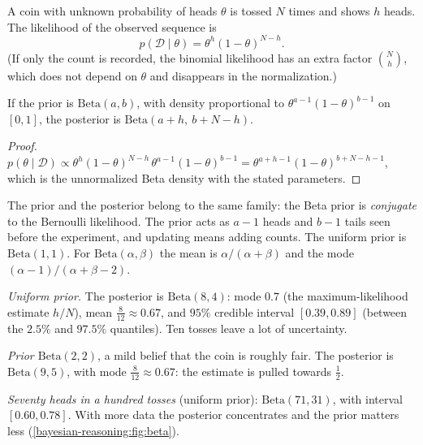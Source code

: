 \begin{notechapter}
A coin with unknown probability of heads $\theta$ is tossed $N$ times and shows
$h$ heads. The likelihood of the observed sequence is
\[
  p(\mathcal D\mid\theta) = \theta^h(1-\theta)^{N-h}.
\]
(If only the count is recorded, the binomial likelihood has an extra factor
$\binom Nh$, which does not depend on $\theta$ and disappears in the
normalization.)

\begin{proposition}\label{bayesian-reasoning:prop:conjugate}
If the prior is $\mathrm{Beta}(a,b)$, with density proportional to
$\theta^{a-1}(1-\theta)^{b-1}$ on $[0,1]$, the posterior is
$\mathrm{Beta}(a + h,\ b + N - h)$.
\end{proposition}

\begin{proof}
$p(\theta\mid\mathcal D)\propto\theta^h(1-\theta)^{N-h}\,\theta^{a-1}(1-\theta)^{b-1}
= \theta^{a+h-1}(1-\theta)^{b+N-h-1}$, which is the unnormalized Beta density with
the stated parameters.
\end{proof}

The prior and the posterior belong to the same family: the Beta prior is
\emph{conjugate} to the Bernoulli likelihood. The prior acts as $a - 1$ heads
and $b - 1$ tails seen before the experiment, and updating means adding counts.
The uniform prior is $\mathrm{Beta}(1,1)$. For $\mathrm{Beta}(\alpha,\beta)$ the
mean is $\alpha/(\alpha+\beta)$ and the mode $(\alpha-1)/(\alpha+\beta-2)$.

\begin{example}\label{bayesian-reasoning:ex:coin}
\emph{Uniform prior.} The posterior is $\mathrm{Beta}(8,4)$: mode $0.7$ (the
maximum-likelihood estimate $h/N$), mean $\frac8{12}\approx0.67$, and $95\%$
credible interval $[0.39, 0.89]$ (between the $2.5\%$ and $97.5\%$ quantiles).
Ten tosses leave a lot of uncertainty.

\emph{Prior $\mathrm{Beta}(2,2)$}, a mild belief that the coin is roughly fair. The
posterior is $\mathrm{Beta}(9,5)$, with mode $\frac8{12}\approx0.67$: the estimate
is pulled towards $\frac12$.

\emph{Seventy heads in a hundred tosses} (uniform prior): $\mathrm{Beta}(71,31)$,
with interval $[0.60, 0.78]$. With more data the posterior concentrates and the
prior matters less (\cref{bayesian-reasoning:fig:beta}).
\end{example}


\end{notechapter}
